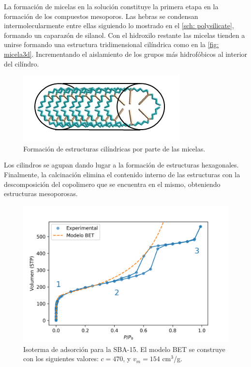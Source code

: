 \documentclass[fleqn,11pt]{SelfArx}
\begin{document}
	La formaci\'on de micelas en la soluci\'on constituye la primera etapa en la formaci\'on de los compuestos mesoporos. Las hebras se condensan intermolecularmente entre ellas siguiendo lo mostrado en el \autoref{sch: polysilicate}, formando un caparaz\'on de silanol. Con el hidroxilo restante las micelas tienden a unirse formando una estructura tridimensional cil\'indrica como en la \autoref{fig: micela3d}. Incrementando el aislamiento de los grupos m\'as hidrof\'obicos al interior del cil\'indro.
	\begin{figure}[h]
		\centering
		\includegraphics[width=0.8\linewidth]{structures/micela3D.png}
		\caption{Formaci\'on de estructuras cil\'indricas por parte de las micelas.}
		\label{fig: micela3d}
	\end{figure}
	
	Los cilindros se agupan dando lugar a la formaci\'on de estructuras hexagonales. Finalmente, la calcinaci\'on elimina el contenido interno de las estructuras con la descomposici\'on del copolimero que se encuentra en el mismo, obteniendo estructuras mesoporosas.
	
	\begin{figure}[h]
		\centering
		\includegraphics[width=\linewidth]{isoterma}
		\caption{Isoterma de adsorci\'on para la SBA-15. El modelo BET se construye con los siguientes valores: $c = 470$, y $v_m = 154$ cm$^3$/g.}
		\label{fig: isoterma}
	\end{figure}
\end{document}
